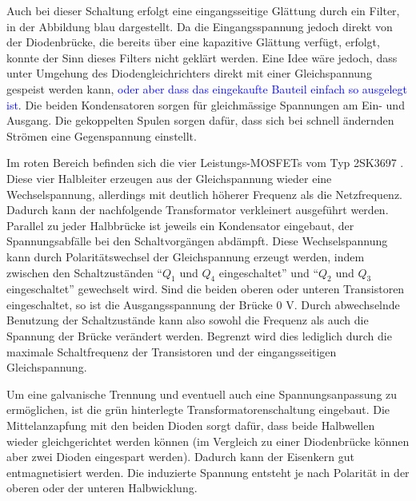 Auch bei dieser Schaltung erfolgt eine eingangsseitige Glättung durch ein Filter, in der Abbildung blau dargestellt. Da die Eingangsspannung jedoch direkt von der Diodenbrücke, die bereits über eine kapazitive Glättung verfügt, erfolgt, konnte der Sinn dieses Filters nicht geklärt werden. Eine Idee wäre jedoch, dass unter Umgehung des Diodengleichrichters direkt mit einer Gleichspannung gespeist werden kann, \textcolor{blue}{oder aber dass das eingekaufte Bauteil einfach so ausgelegt ist}. Die beiden Kondensatoren sorgen für gleichmässige Spannungen am Ein- und Ausgang. Die gekoppelten Spulen sorgen dafür, dass sich bei schnell ändernden Strömen eine Gegenspannung einstellt.

Im roten Bereich befinden sich die vier Leistungs-MOSFETs vom Typ 2SK3697 \cite{2sk3697}. Diese vier Halbleiter erzeugen aus der Gleichspannung wieder eine Wechselspannung, allerdings mit deutlich höherer Frequenz als die Netzfrequenz. Dadurch kann der nachfolgende Transformator verkleinert ausgeführt werden. Parallel zu jeder Halbbrücke ist jeweils ein Kondensator eingebaut, der Spannungsabfälle bei den Schaltvorgängen abdämpft. Diese Wechselspannung kann durch Polaritätswechsel der Gleichspannung erzeugt werden, indem zwischen den Schaltzuständen "`$Q_1$ und $Q_4$ eingeschaltet"' und "`$Q_2$ und $Q_3$ eingeschaltet"' gewechselt wird. Sind die beiden oberen oder unteren Transistoren eingeschaltet, so ist die Ausgangsspannung der Brücke $0$ V. Durch abwechselnde Benutzung der Schaltzustände kann also sowohl die Frequenz als auch die Spannung der Brücke verändert werden. Begrenzt wird dies lediglich durch die maximale Schaltfrequenz der Transistoren und der eingangsseitigen Gleichspannung.

Um eine galvanische Trennung und eventuell auch eine Spannungsanpassung zu ermöglichen, ist die grün hinterlegte Transformatorenschaltung eingebaut. Die Mittelanzapfung mit den beiden Dioden sorgt dafür, dass beide Halbwellen wieder gleichgerichtet werden können (im Vergleich zu einer Diodenbrücke können aber zwei Dioden eingespart werden). Dadurch kann der Eisenkern gut entmagnetisiert werden. Die induzierte Spannung entsteht je nach Polarität in der oberen oder der unteren Halbwicklung.

